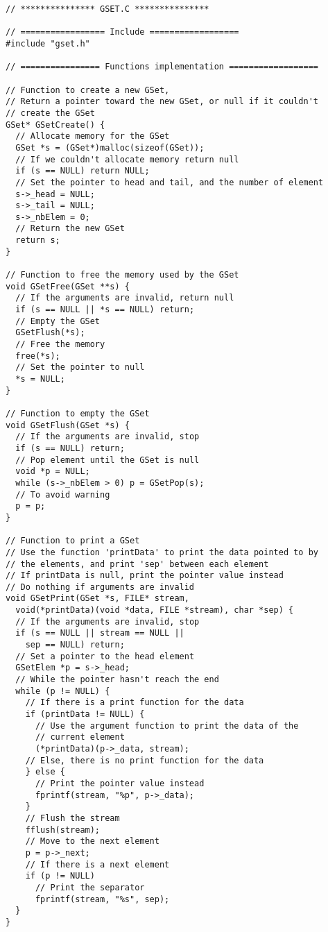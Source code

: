\documentclass[12pt, a4paper]{article}
\begin{document}
\begin{scriptsize}
\begin{ttfamily}
\begin{lstlisting}
// *************** GSET.C ***************

// ================= Include ==================
#include "gset.h"

// ================ Functions implementation ==================

// Function to create a new GSet,
// Return a pointer toward the new GSet, or null if it couldn't
// create the GSet
GSet* GSetCreate() {
  // Allocate memory for the GSet
  GSet *s = (GSet*)malloc(sizeof(GSet));
  // If we couldn't allocate memory return null
  if (s == NULL) return NULL;
  // Set the pointer to head and tail, and the number of element
  s->_head = NULL;
  s->_tail = NULL;
  s->_nbElem = 0;
  // Return the new GSet
  return s;
}

// Function to free the memory used by the GSet
void GSetFree(GSet **s) {
  // If the arguments are invalid, return null
  if (s == NULL || *s == NULL) return;
  // Empty the GSet
  GSetFlush(*s);
  // Free the memory
  free(*s);
  // Set the pointer to null
  *s = NULL;
}

// Function to empty the GSet
void GSetFlush(GSet *s) {
  // If the arguments are invalid, stop
  if (s == NULL) return;
  // Pop element until the GSet is null
  void *p = NULL;
  while (s->_nbElem > 0) p = GSetPop(s);
  // To avoid warning
  p = p;
}

// Function to print a GSet
// Use the function 'printData' to print the data pointed to by 
// the elements, and print 'sep' between each element
// If printData is null, print the pointer value instead
// Do nothing if arguments are invalid
void GSetPrint(GSet *s, FILE* stream, 
  void(*printData)(void *data, FILE *stream), char *sep) {
  // If the arguments are invalid, stop
  if (s == NULL || stream == NULL || 
    sep == NULL) return;
  // Set a pointer to the head element
  GSetElem *p = s->_head;
  // While the pointer hasn't reach the end
  while (p != NULL) {
    // If there is a print function for the data
    if (printData != NULL) {
      // Use the argument function to print the data of the 
      // current element
      (*printData)(p->_data, stream);
    // Else, there is no print function for the data
    } else {
      // Print the pointer value instead
      fprintf(stream, "%p", p->_data);
    }
    // Flush the stream
    fflush(stream);
    // Move to the next element
    p = p->_next;
    // If there is a next element
    if (p != NULL)
      // Print the separator
      fprintf(stream, "%s", sep);
  }
}


\end{lstlisting}
\end{ttfamily}
\end{scriptsize}
\end{document}
